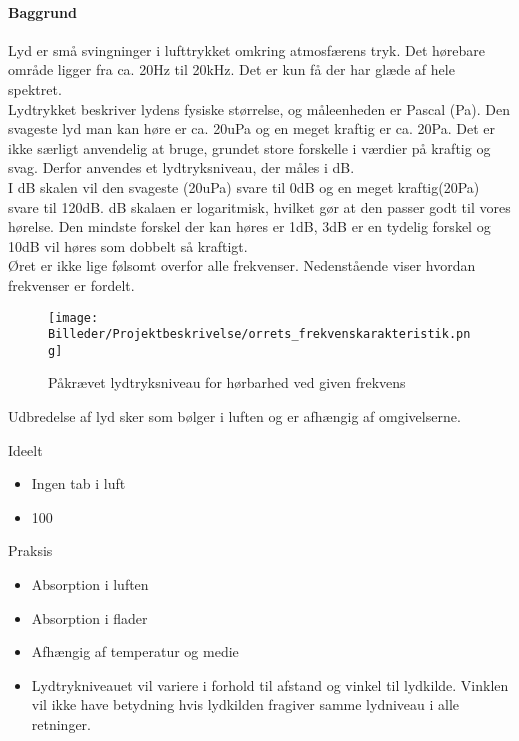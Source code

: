 \paragraph{Baggrund}
\label{chap:baggrund}


Lyd er små svingninger i lufttrykket omkring atmosfærens tryk. Det hørebare område ligger fra ca. 20Hz til 20kHz. Det er kun få der har glæde af hele spektret.\\
Lydtrykket beskriver lydens fysiske størrelse, og måleenheden er Pascal (Pa). Den svageste lyd man kan høre er ca. 20uPa og en meget kraftig er ca. 20Pa. Det er ikke særligt anvendelig at bruge, grundet store forskelle i værdier på kraftig og svag. Derfor anvendes et lydtryksniveau, der måles i dB.\\
I dB skalen vil den svageste (20uPa) svare til 0dB og en meget kraftig(20Pa) svare til 120dB. dB skalaen er logaritmisk, hvilket gør at den passer godt til vores hørelse. Den mindste forskel der kan høres er 1dB, 3dB er en tydelig forskel og 10dB vil høres som dobbelt så kraftigt.\\

Øret er ikke lige følsomt overfor alle frekvenser. Nedenstående viser hvordan frekvenser er fordelt.

\begin{figure}[h!]
  \centering
    \texttt{[image: Billeder/Projektbeskrivelse/orrets\_frekvenskarakteristik.png]}
    \caption{Påkrævet lydtryksniveau for hørbarhed ved given frekvens}
\end{figure}\medskip
 
Udbredelse af lyd sker som bølger i luften og er afhængig af omgivelserne.

Ideelt
\begin{itemize}
\item Ingen tab i luft
\item 100 %
\end{itemize}

Praksis
\begin{itemize}
\item Absorption i luften
\item Absorption i flader
\item Afhængig af temperatur og medie
\item Lydtrykniveauet vil variere i forhold til afstand og vinkel til lydkilde. Vinklen vil ikke have betydning hvis lydkilden fragiver samme lydniveau i alle retninger.
\end{itemize}\medskip

